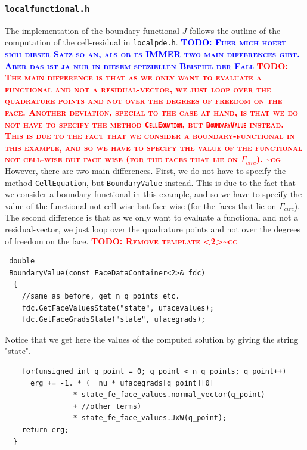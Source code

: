 \documentclass[prodmode,acmtoms]{acmsmall}
\numberwithin{equation}{section}
\newcommand{\todo}[1]{\textbf{\textsc{\textcolor{blue}{TODO: #1}}}}
\newcommand{\todocg}[1]{\textbf{\textsc{\textcolor{red}{TODO: #1\textasciitilde cg}}}}
\begin{document}
\subsubsection{\texttt{localfunctional.h}}
The implementation of the boundary-functional $J$ follows the outline of the
computation of the cell-residual in \texttt{localpde.h}. 
\todo{Fuer mich hoert sich dieser Satz so an, als ob es IMMER two main
  differences gibt. Aber das ist ja nur in diesem speziellen Beispiel der Fall}
  \todocg{The main difference is that as we only want to evaluate a functional and not a residual-vector, we just loop over the quadrature points and not over the degrees of freedom on the face. Another deviation, special to the case at hand, is that we do not have to specify the method \texttt{CellEquation}, but \texttt{BoundaryValue} instead. This is due to the fact that we consider a boundary-functional in this example, and so we have to specify the value of the functional not cell-wise but face wise (for the faces that lie on $\Gamma_{circ}$). }
However, there are two main differences. First, we do not have to specify the method \texttt{CellEquation}, but \texttt{BoundaryValue} instead. This is due to the fact that we consider a boundary-functional in this example, and so we have to specify the value of the functional not cell-wise but face wise (for the faces that lie on $\Gamma_{circ}$). The second difference is that as we only want to evaluate a functional and not a residual-vector, we just loop over the quadrature points and not over the degrees of freedom on the face.
\todocg{Remove template <2>}
\begin{lstlisting}
 double
 BoundaryValue(const FaceDataContainer<2>& fdc)
  {
    //same as before, get n_q_points etc.
    fdc.GetFaceValuesState("state", ufacevalues);
    fdc.GetFaceGradsState("state", ufacegrads);
\end{lstlisting}
Notice that we get here the values of the computed solution by giving the string "state".
\begin{lstlisting}
    for(unsigned int q_point = 0; q_point < n_q_points; q_point++)
      erg += -1. * ( _nu * ufacegrads[q_point][0]
                * state_fe_face_values.normal_vector(q_point)
                + //other terms)        
                * state_fe_face_values.JxW(q_point);
    return erg;
  }
\end{lstlisting}
\end{document}
